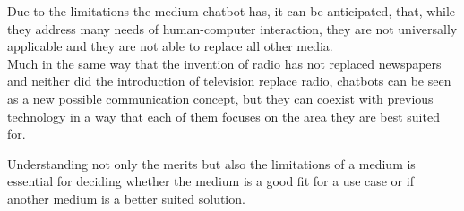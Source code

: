 Due to the limitations the medium chatbot has, it can be anticipated,
that, while they address many needs of human-computer interaction,
they are not universally applicable and they are not able to replace all other media.
\\

Much in the same way that the invention of radio has not replaced newspapers
and neither did the introduction of television replace radio,
chatbots can be seen as a new possible communication concept,
but they can coexist with previous technology in a way that each of them focuses on the area they are best suited for.

Understanding not only the merits but also the limitations of a medium is essential for deciding
whether the medium is a good fit for a use case or if another medium is a better suited solution.
\\

